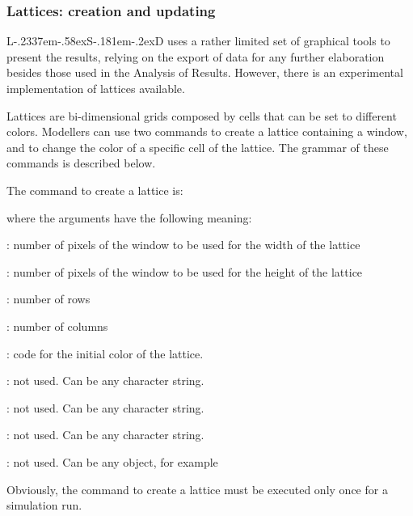 \documentclass [11pt,a4paper] {book}
\def\LsD{{L\kern-.2337em\lower-.58ex\hbox{S}\kern-.181em\lower-.2ex\hbox{D}}\xspace}
\begin{document}
\subsubsection{Lattices: creation and updating}
\LsD uses a rather limited set of graphical tools to present the results, relying on the export of data for any further elaboration besides those used in the Analysis of Results. However, there is an experimental implementation of lattices available.

Lattices are bi-dimensional grids composed by cells that can be set to different colors. Modellers can use two commands to create a lattice containing a window, and to change the color of a specific cell of the lattice. The grammar of these commands is described below.

The command to create a lattice is:


where the arguments have the following meaning:

\begin{list}{-}{\itemsep -0.2cm}

\item {}: number of pixels of the window to be used for the width of the lattice

\item {}: number of pixels of the window to be used for the height of the lattice

\item {}: number of rows

\item {}: number of columns

\item {}: code for the initial color of the lattice.

\item {}: not used. Can be any character string.

\item {}: not used. Can be any character string.
\item {}: not used. Can be any character string.
\item {}: not used. Can be any object, for example 

\end{list}


Obviously, the command to create a lattice must be executed only once for a simulation run.
\end{document}
